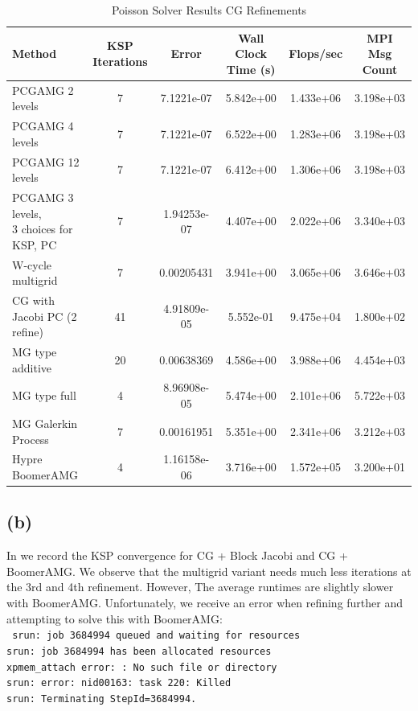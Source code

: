 \begin{table}[h!]
\hspace{-2.5cm}\begin{tabular}{lccccc}
\hline
\textbf{Method} & \textbf{KSP Iterations} & \textbf{Error} & \textbf{Wall Clock Time (s)} & \textbf{Flops/sec} & \textbf{MPI Msg Count} \\
\hline
PCGAMG 2 levels & 7 & 7.1221e-07 & 5.842e+00 & 1.433e+06 & 3.198e+03  \\
PCGAMG 4 levels & 7 & 7.1221e-07 & 6.522e+00 & 1.283e+06 & 3.198e+03  \\
PCGAMG 12 levels & 7 & 7.1221e-07 & 6.412e+00  & 1.306e+06 & 3.198e+03 \\
\makecell{PCGAMG 3 levels, \\ 3 choices for KSP, PC}& 7 & 1.94253e-07 & 4.407e+00 & 2.022e+06 & 3.340e+03 \\
\hline
W-cycle multigrid & 7 & 0.00205431 & 3.941e+00 & 3.065e+06  &3.646e+03  \\
CG with Jacobi PC (2 refine) & 41 & 4.91809e-05 & 5.552e-01 & 9.475e+04 & 1.800e+02  \\
MG type additive & 20 & 0.00638369 & 4.586e+00  &3.988e+06  & 4.454e+03 \\
MG type full & 4 & 8.96908e-05 & 5.474e+00 & 2.101e+06 & 5.722e+03 \\
MG Galerkin Process & 7 & 0.00161951 & 5.351e+00 & 2.341e+06 & 3.212e+03 \\
Hypre BoomerAMG & 4 & 1.16158e-06 & 3.716e+00 & 1.572e+05 & 3.200e+01 \\
\hline
\end{tabular}
\caption{Poisson Solver Results CG Refinements}
\label{mgcombos}
\end{table}
\FloatBarrier

\subsection*{(b)}
\FloatBarrier
In  we record the KSP convergence for CG + Block Jacobi and CG + BoomerAMG. We observe that the multigrid variant needs much less iterations at the 3rd and 4th refinement. However, The average runtimes are slightly slower with BoomerAMG. Unfortunately, we receive an error when refining further and attempting to solve this with BoomerAMG:
\\

\texttt{
srun: job 3684994 queued and waiting for resources\\
srun: job 3684994 has been allocated resources\\
xpmem\_attach error: : No such file or directory\\
srun: error: nid00163: task 220: Killed\\
srun: Terminating StepId=3684994.
}


